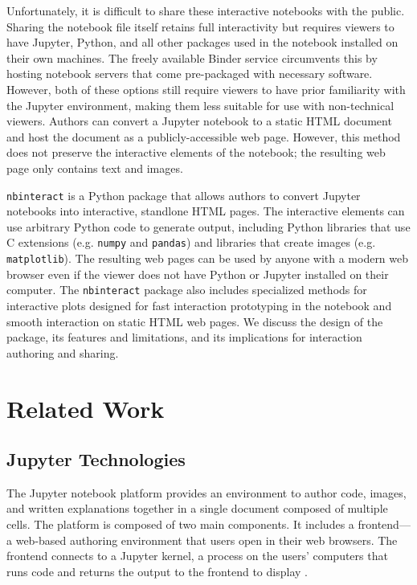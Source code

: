 \documentclass[nobib]{tufte-handout}
\newcommand{\code}[1]{\texttt{#1}}
\begin{document}
Unfortunately, it is difficult to share these interactive notebooks with the
public. Sharing the notebook file itself retains full interactivity but
requires viewers to have Jupyter, Python, and all other packages used in the
notebook installed on their own machines. The freely available Binder service
circumvents this by hosting notebook servers that come pre-packaged with
necessary software. However, both of these options still require viewers to
have prior familiarity with the Jupyter environment, making them less suitable
for use with non-technical viewers. Authors can convert a Jupyter notebook to a
static HTML document and host the document as a publicly-accessible web page.
However, this method does not preserve the interactive elements of the
notebook; the resulting web page only contains text and images.

\code{nbinteract} is a Python package that allows authors to convert Jupyter
notebooks into interactive, standlone HTML pages. The interactive elements can
use arbitrary Python code to generate output, including Python libraries that
use C extensions (e.g. \code{numpy} and \code{pandas}) and libraries that
create images (e.g. \code{matplotlib}). The resulting web pages can be used by
anyone with a modern web browser even if the viewer does not have Python or
Jupyter installed on their computer. The \code{nbinteract} package also
includes specialized methods for interactive plots designed for fast
interaction prototyping in the notebook and smooth interaction on static HTML
web pages. We discuss the design of the package, its features and limitations,
and its implications for interaction authoring and sharing.


\section{Related Work} %
\label{sec:related_work}

\subsection{Jupyter Technologies} %
\label{sub:jupyter_technologies}

The Jupyter notebook platform provides an environment to author code, images,
and written explanations together in a single document composed of multiple
cells. The platform is composed of two main components. It includes a
frontend---a web-based authoring environment that users open in their web
browsers. The frontend connects to a Jupyter kernel, a process on the users'
computers that runs code and returns the output to the frontend to display
\cite{thomas_jupyter_2016}.
\end{document}
